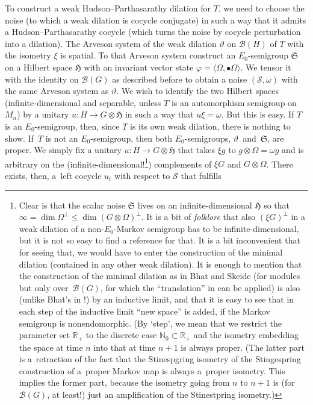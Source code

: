 \documentclass[11pt]{article}
\numberwithin{equation}{section}
\newcommand{\eus}[1]{\mathscr{#1}}
\newcommand{\euf}[1]{\mathfrak{#1}}
\newcommand{\bb}[1]{\mathbb{#1}}
\newcommand{\vt}{\vartheta}
\newcommand{\vp}{\varphi}
\newcommand{\om}{\omega}
\newcommand{\Om}{\Omega}
\newcommand{\AB}[1]{\langle#1\rangle}
\newcommand{\N}{\bb{N}}
\newcommand{\R}{\bb{R}}
\newcommand{\sB}{\eus{B}}
\newcommand{\sS}{\eus{S}}
\newcommand{\eH}{\euf{H}}
\newcommand{\eS}{\euf{S}}
\numberwithin{equation}{section}
\begin{document}
To construct a weak Hudson--Parthasarathy dilation for $T$, we need to choose the noise (to which a weak dilation is cocycle conjugate) in such a way that it admits a Hudson--Parthasarathy cocycle (which turns the noise by cocycle perturbation into a dilation). The Arveson system of the weak dilation $\vt$ on $\sB(H)$ of $T$ with the isometry $\xi$ is spatial. To that Arveson system construct an $E_0$-semigroup $\eS$ on a Hilbert space $\eH$ with an invariant vector state $\vp=\AB{\Om,\bullet\Om}$. We tensor it with the identity on $\sB(G)$ as described before to obtain a noise $(\sS,\om)$ with the same Arveson system as $\vt$. We wish to identify the two Hilbert spaces (infinite-dimensional and separable, unless $T$ is an automorphism semigroup on $M_n$) by a unitary $u\colon H\rightarrow G\otimes\eH$ in such a way that $u\xi=\om$. But this is easy. If $T$ is an $E_0$-semigroup, then, since $T$ is its own weak dilation, there is nothing to show. If~$T$ is not an $E_0$-semigroup, then both $E_0$-semigroups, $\vt$~and~$\eS$, are proper. We simply fix a unitary $u\colon H\rightarrow G\otimes\eH$ that takes $\xi g$ to $g\otimes\Om=\om g$ and is arbitrary on the (infinite-dimensional!\footnote{Clear is that the scalar noise $\eS$ lives on an infinite-dimensional $\eH$ so that $\infty=\dim\Om^\perp\le\dim(G\otimes\Om)^\perp$. It is a bit of {\it folklore} that also $(\xi G)^\perp$ in a weak dilation of a non-$E_0$-Markov semigroup has to be infinite-dimensional, but it is not so easy to find a reference for that. It is a bit inconvenient that for seeing that, we would have to enter the construction of the minimal dilation (contained in any other weak dilation). It is enough to mention that the construction of the minimal dilation as in Bhat and Skeide \cite[Section 5]{BhSk00} (for modules but only over~$\sB(G)$, for which the ``translation'' in \cite[Section 13]{BhSk00} can be applied) is also (unlike Bhat's in \cite{Bha96}!) by an inductive limit, and that it is easy to see that in each step of the inductive limit ``new space'' is added, if the Markov semigroup is nonendomorphic. (By `step', we mean that we restrict the parameter set $\R_+$ to the discrete case $\N_0\subset\R_+$ and the isometry embedding the space at time $n$ into that at time $n+1$ is always proper. (The latter part is a~retraction of the fact that the Stinespgring isometry of the Stingespring construction of a~proper Markov map is always a~proper isometry. This implies the former part, because the isometry going from $n$ to $n+1$ is (for $\sB(G)$, at least!) just an amplification of the Stinestpring isometry.)}) complements of $\xi G$ and $G\otimes\Om$. There exists, then, a~left cocycle $u_t$ with respect to $\sS$ that fulfills
\end{document}
